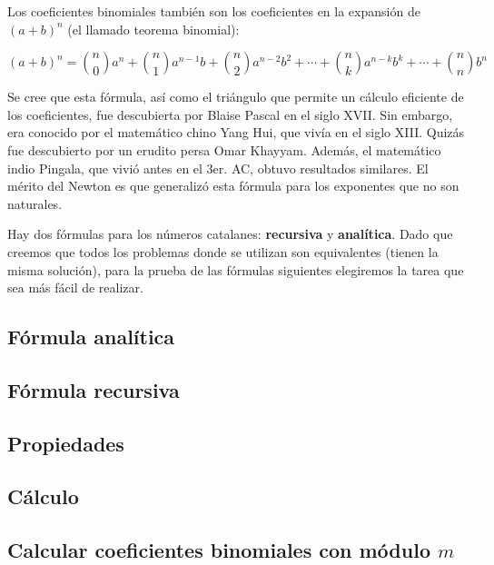 Los coeficientes binomiales también son los coeficientes en la expansión de $ (a + b) ^ n $ (el llamado teorema binomial):

$$(a+b)^n = \binom n 0 a^n + \binom n 1 a^{n-1} b + \binom n 2 a^{n-2} b^2 + \cdots + \binom n k a^{n-k} b^k + \cdots + \binom n n b^n$$

Se cree que esta fórmula, así como el triángulo que permite un cálculo eficiente de los coeficientes, fue descubierta por Blaise Pascal en el siglo XVII. Sin embargo, era conocido por el matemático chino Yang Hui, que vivía en el siglo XIII. Quizás fue descubierto por un erudito persa Omar Khayyam. Además, el matemático indio Pingala, que vivió antes en el 3er. AC, obtuvo resultados similares. El mérito del Newton es que generalizó esta fórmula para los exponentes que no son naturales.

Hay dos fórmulas para los números catalanes: \textbf{recursiva} y \textbf{analítica}. Dado que creemos que todos los problemas donde se utilizan son equivalentes (tienen la misma solución), para la prueba de las fórmulas siguientes elegiremos la tarea que sea más fácil de realizar.



\subsection{Fórmula analítica}


\subsection{Fórmula recursiva}


\subsection{Propiedades}


\subsection{Cálculo}


\subsection{Calcular coeficientes binomiales con módulo $m$}


